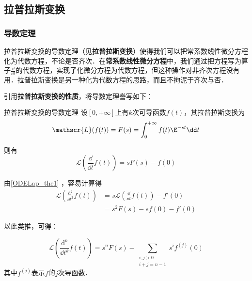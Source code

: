 

\subsection{拉普拉斯变换}

\subsubsection{导数定理}

拉普拉斯变换的导数定理（见\textbf{拉普拉斯变换}）使得我们可以把常系数线性微分方程化为代数方程，不论是否齐次．在\textbf{常系数线性微分方程}中，我们通过把方程写为算子$\frac{\dd }{\dd t}$的代数方程，实现了化微分方程为代数方程，但这种操作对非齐次方程没有用．拉普拉斯变换是另一种化为代数方程的思路，而且不拘泥于齐次与否．

引用\textbf{拉普拉斯变换的性质}，将导数定理誊写如下：
\begin{theorem}{拉普拉斯变换的导数定理}\label{ODELap_the1}
设$[0, +\infty]$上有$k$次可导函数$f(t)$，其拉普拉斯变换为
\begin{equation}
\mathscr{L}(f(t))=F(s)=\int^{+\infty}_0f(t)\E^{-st}\dd t
\end{equation}

则有
\begin{equation}
\mathscr{L}(\frac{\dd}{\dd t}f(t))=sF(s)-f(0)
\end{equation}
\end{theorem}

由\autoref{ODELap_the1} ，容易计算得
\begin{equation}
\begin{aligned}
\mathscr{L}(\frac{\mathrm{d}^2}{\dd t^2}f(t))&=s\mathscr{L}(\frac{\dd}{\dd t}f(t))-f'(0)\\
&=s^2F(s)-sf(0)-f'(0)
\end{aligned}
\end{equation}

以此类推，可得：

\begin{corollary}{}\label{ODELap_cor1}
\begin{equation}
\mathscr{L}(\frac{\mathrm{d}^k}{\dd t^k}f(t))=s^nF(s)-\sum_{\substack{i, j>0\\   i+j=n-1}}s^if^{(j)}(0)
\end{equation}
其中$f^{(j)}$表示$f$的$j$次导函数．



\end{corollary}




